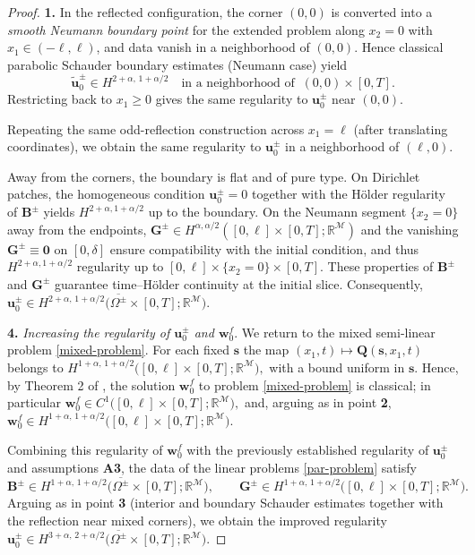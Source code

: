 \documentclass[reqno]{amsart}            %
\numberwithin{equation}{section}
\begin{document}
\begin{proof} {\bf 1.}
		In the reflected configuration, the corner $(0,0)$ is converted into a \emph{smooth Neumann boundary point} for the extended problem along $x_2=0$ with $x_1\in(-\ell,\ell)$, and data vanish in a neighborhood of $(0,0)$. 
		Hence classical parabolic Schauder boundary estimates (Neumann case) yield
		\[
		\widetilde{\mathbf{u}}^\pm_0 \in H^{2+\alpha,\,1+\alpha/2}\quad \text{in a neighborhood of }\ (0,0)\times[0,T].
		\]
		Restricting back to $x_1\ge 0$ gives the same regularity to ${\mathbf{u}}^\pm_0$ near $(0,0)$.
		
		Repeating the same odd-reflection construction across $x_1=\ell$ (after translating coordinates), we obtain  the same regularity to  ${\mathbf{u}}^\pm_0$ in a neighborhood of $(\ell,0).$ 
		
		Away from the corners, the boundary is flat and of pure type. 
		On Dirichlet patches, the homogeneous condition $\mathbf{u}^\pm_0=0$ together with the Hölder regularity of $\mathbf{B}^\pm$ yields $H^{2+\alpha,1+\alpha/2}$ up to the boundary. 
		On the Neumann segment $\{x_2=0\}$ away from the endpoints, $\mathbf{G}^\pm \in H^{\alpha,\alpha/2}([0,\ell]\times[0,T]; \mathbb{R}^\mathcal{M})$ and the vanishing $\mathbf{G}^\pm\equiv \mathbf{0}$ on $[0,\delta]$ ensure compatibility with the initial condition, and thus $H^{2+\alpha,1+\alpha/2}$ regularity up to $[0,\ell]\times\{x_2=0\}\times [0,T]$. 
		These properties of $\mathbf{B}^\pm$ and $\mathbf{G}^\pm$ guarantee time–Hölder continuity at the initial slice. 
		Consequently,
		$
		\mathbf{u}^\pm_0 \in H^{2+\alpha,\,1+\alpha/2}\big(\overline{\Omega^\pm}\times[0,T]; \mathbb{R}^\mathcal{M}\big).
		$
		
		\smallskip
		
		\noindent
		\textbf{4.} \emph{Increasing the regularity of $\mathbf{u}^\pm_0$ and $\mathbf{w}^f_0.$} 
		We return to the mixed semi-linear problem \eqref{mixed-problem}. For each fixed $\mathbf{s}$
		the map $(x_1,t)\mapsto \mathbf{Q}(\mathbf{s},x_1,t)$ belongs to 
		$
		H^{1+\alpha,\,1+\alpha/2}\big([0,\ell]\times[0,T];\mathbb{R}^\mathcal{M}\big),
		$
		with a bound uniform in $\mathbf{s}$. Hence, by Theorem 2 of \cite{Myshkis_1960}, the solution $\mathbf{w}^f_0$ to problem \eqref{mixed-problem} is classical; in particular
		$
		\mathbf{w}^f_0\in C^1\big([0,\ell]\times[0,T];\mathbb{R}^\mathcal{M}\big),
		$
		and, arguing as in point {\bf 2}, $\mathbf{w}^f_0\in H^{1+\alpha,\,1+\alpha/2}\big([0,\ell]\times[0,T];\mathbb{R}^\mathcal{M}\big)$.
		
		Combining this regularity of $\mathbf{w}^f_0$ with the previously established regularity of $\mathbf{u}^\pm_0$ and assumptions {\bf A3}, the data of the linear problems \eqref{par-problem} satisfy
		$$
		\mathbf{B}^\pm\in H^{1+\alpha,\,1+\alpha/2}\big(\overline{\Omega^\pm}\times[0,T];\mathbb{R}^\mathcal{M}\big), \qquad
		\mathbf{G}^\pm\in H^{1+\alpha,\,1+\alpha/2}\big([0,\ell]\times[0,T];\mathbb{R}^\mathcal{M}\big).
		$$
		Arguing as in point {\bf 3} (interior and boundary Schauder estimates together with the reflection near mixed corners), we obtain the improved regularity
		$
		\mathbf{u}^\pm_0\in H^{3+\alpha,\,2+\alpha/2}\big(\overline{\Omega^\pm}\times[0,T];\mathbb{R}^\mathcal{M}\big).
		$
		

\end{proof}
\end{document}
